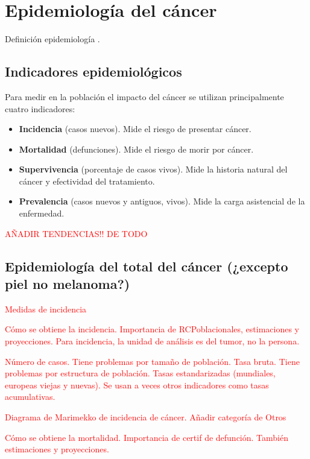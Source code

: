 \chapter{Epidemiología del cáncer}

Definición epidemiología \cite{IARC1999}.

\section{Indicadores epidemiológicos}

Para medir en la población el impacto del cáncer se utilizan principalmente cuatro indicadores:

\begin{itemize}
	\item \textbf{Incidencia} (casos nuevos). Mide el riesgo de presentar cáncer.
	\item \textbf{Mortalidad} (defunciones). Mide el riesgo de morir por cáncer.
	\item \textbf{Supervivencia} (porcentaje de casos vivos). Mide la historia natural del cáncer y efectividad del tratamiento.
	\item \textbf{Prevalencia} (casos nuevos y antiguos, vivos). Mide la carga asistencial de la enfermedad.
\end{itemize}

\textcolor{red}{AÑADIR TENDENCIAS!! DE TODO}

\section{Epidemiología del total del cáncer (¿excepto piel no melanoma?)}

\textcolor{red}{Medidas de incidencia}

\textcolor{red}{Cómo se obtiene la incidencia. Importancia de RCPoblacionales, estimaciones y proyecciones. Para incidencia, la unidad de análisis es del tumor, no la persona.}

\textcolor{red}{Número de casos. Tiene problemas por tamaño de población. Tasa bruta. Tiene problemas por estructura de población. Tasas estandarizadas (mundiales, europeas viejas y nuevas). Se usan a veces otros indicadores como tasas acumulativas.}


\textcolor{red}{Diagrama de Marimekko de incidencia de cáncer. Añadir categoría de Otros}

\textcolor{red}{Cómo se obtiene la mortalidad. Importancia de certif de defunción. También estimaciones y proyecciones.}

